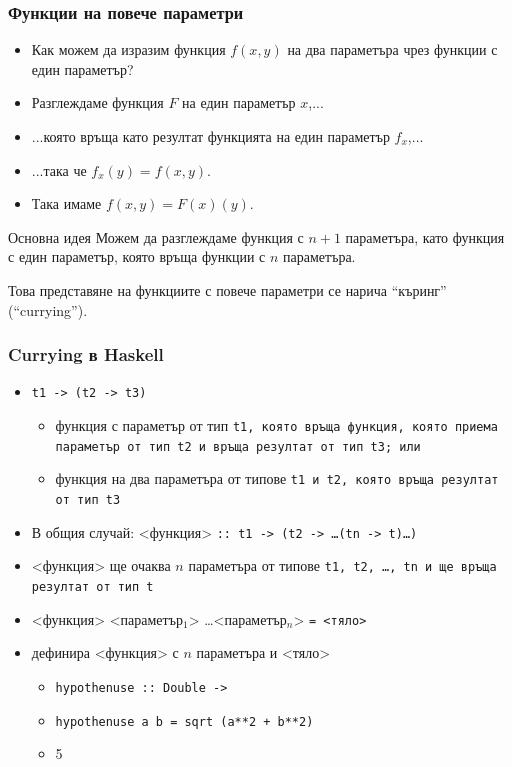 \documentclass{beamer}
\begin{document}
\begin{frame}
  \frametitle{Функции на повече параметри}
  \begin{itemize}[<+->]
  \item Как можем да изразим функция $f(x,y)$ на два параметъра чрез функции с един параметър?
  \item Разглеждаме функция $F$ на един параметър $x$,...
  \item ...която връща като резултат функцията на един параметър $f_x$,...
  \item ...така че $f_x(y) = f(x,y)$.
  \item Така имаме $f(x,y) = F(x)(y)$.
  \end{itemize}
  \onslide<+->
  \begin{block}{Основна идея}
    Можем да разглеждаме функция с $n+1$ параметъра, като функция с един параметър, която връща функции с $n$ параметъра.
  \end{block}
  \onslide<+->
  \alert{Това представяне на функциите с повече параметри се нарича ``къринг'' (``currying'').}
\end{frame}

\begin{frame}
  \frametitle{Currying в Haskell}
  \begin{itemize}[<+->]
  \item \tt{t1 \alert{->} (t2 \alert{->} t3)}
    \begin{itemize}
    \item функция с параметър от тип \tt{t1}, която връща функция, която приема параметър от тип \tt{t2} и връща резултат от тип \tt{t3}; или
    \item функция на два параметъра от типове \tt{t1} и \tt{t2}, която връща резултат от тип \tt{t3}
    \end{itemize}
  \item В общия случай: <функция> \tt{\alert{::} t1 \alert{->} (t2 \alert{->}} \ldots \tt{(tn \alert{->} t)}\ldots\tt)
  \item{} <функция> ще очаква $n$ параметъра от типове \tt{t1}, \tt{t2}, \ldots, \tt{tn} и ще връща резултат от тип \tt{t}
  \item{} <функция> <параметър$_1$> \ldots <параметър$_n$> \tt= <тяло>
  \item дефинира <функция> с $n$ параметъра и <тяло>
    \begin{itemize}
    \item \tt{hypothenuse :: Double -> }
    \item \tt{hypothenuse a b = sqrt (a**2 + b**2)}
    \item {}5
    \end{itemize}
  \end{itemize}
\end{frame}
\end{document}

